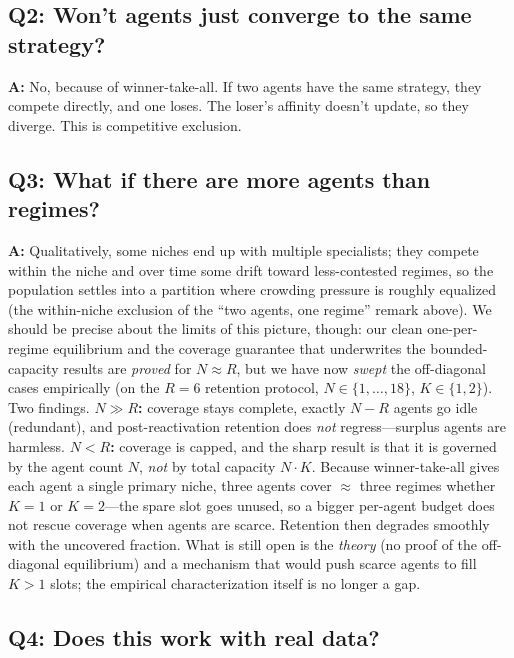 \documentclass[11pt,a4paper]{article}
\theoremstyle{definition}
\theoremstyle{plain}
\begin{document}
\subsection{Q2: Won't agents just converge to the same strategy?}

\textbf{A:} No, because of winner-take-all. If two agents have the same strategy, they compete directly, and one loses. The loser's affinity doesn't update, so they diverge. This is competitive exclusion.

\subsection{Q3: What if there are more agents than regimes?}

\textbf{A:} Qualitatively, some niches end up with multiple specialists; they compete
within the niche and over time some drift toward less-contested regimes, so the
population settles into a partition where crowding pressure is roughly equalized
(the within-niche exclusion of the ``two agents, one regime'' remark above). We
should be precise about the limits of this picture, though: our clean one-per-regime
equilibrium and the coverage guarantee that underwrites the bounded-capacity results
are \emph{proved} for $N \approx R$, but we have now \emph{swept} the off-diagonal
cases empirically (on the $R{=}6$ retention protocol, $N\in\{1,\dots,18\}$,
$K\in\{1,2\}$). Two findings. \textbf{$N \gg R$:} coverage stays complete, exactly
$N-R$ agents go idle (redundant), and post-reactivation retention does \emph{not}
regress---surplus agents are harmless. \textbf{$N < R$:} coverage is capped, and the
sharp result is that it is governed by the agent count $N$, \emph{not} by total
capacity $N\!\cdot\!K$. Because winner-take-all gives each agent a single primary
niche, three agents cover $\approx$ three regimes whether $K{=}1$ or $K{=}2$---the
spare slot goes unused, so a bigger per-agent budget does not rescue coverage when
agents are scarce. Retention then degrades smoothly with the uncovered fraction. What
is still open is the \emph{theory} (no proof of the off-diagonal equilibrium) and a
mechanism that would push scarce agents to fill $K>1$ slots; the empirical
characterization itself is no longer a gap.

\subsection{Q4: Does this work with real data?}
\end{document}
